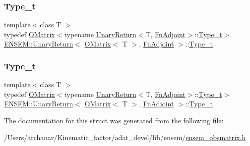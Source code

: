 \subsubsection{\texorpdfstring{Type\_t}{Type\_t}\hspace{0.1cm}{\footnotesize\ttfamily [1/2]}}
{\footnotesize\ttfamily template$<$class T $>$ \\
typedef \mbox{\hyperlink{classENSEM_1_1OMatrix}{O\+Matrix}}$<$typename \mbox{\hyperlink{structENSEM_1_1UnaryReturn}{Unary\+Return}}$<$T, \mbox{\hyperlink{structENSEM_1_1FnAdjoint}{Fn\+Adjoint}}$>$\+::\mbox{\hyperlink{structENSEM_1_1UnaryReturn_3_01OMatrix_3_01T_01_4_00_01FnAdjoint_01_4_aa00f2dd53b3936a34ade7e353b17b138}{Type\+\_\+t}}$>$ \mbox{\hyperlink{structENSEM_1_1UnaryReturn}{E\+N\+S\+E\+M\+::\+Unary\+Return}}$<$ \mbox{\hyperlink{classENSEM_1_1OMatrix}{O\+Matrix}}$<$ T $>$, \mbox{\hyperlink{structENSEM_1_1FnAdjoint}{Fn\+Adjoint}} $>$\+::\mbox{\hyperlink{structENSEM_1_1UnaryReturn_3_01OMatrix_3_01T_01_4_00_01FnAdjoint_01_4_aa00f2dd53b3936a34ade7e353b17b138}{Type\+\_\+t}}}

\mbox{\label{structENSEM_1_1UnaryReturn_3_01OMatrix_3_01T_01_4_00_01FnAdjoint_01_4_aa00f2dd53b3936a34ade7e353b17b138}} 
\subsubsection{\texorpdfstring{Type\_t}{Type\_t}\hspace{0.1cm}{\footnotesize\ttfamily [2/2]}}
{\footnotesize\ttfamily template$<$class T $>$ \\
typedef \mbox{\hyperlink{classENSEM_1_1OMatrix}{O\+Matrix}}$<$typename \mbox{\hyperlink{structENSEM_1_1UnaryReturn}{Unary\+Return}}$<$T, \mbox{\hyperlink{structENSEM_1_1FnAdjoint}{Fn\+Adjoint}}$>$\+::\mbox{\hyperlink{structENSEM_1_1UnaryReturn_3_01OMatrix_3_01T_01_4_00_01FnAdjoint_01_4_aa00f2dd53b3936a34ade7e353b17b138}{Type\+\_\+t}}$>$ \mbox{\hyperlink{structENSEM_1_1UnaryReturn}{E\+N\+S\+E\+M\+::\+Unary\+Return}}$<$ \mbox{\hyperlink{classENSEM_1_1OMatrix}{O\+Matrix}}$<$ T $>$, \mbox{\hyperlink{structENSEM_1_1FnAdjoint}{Fn\+Adjoint}} $>$\+::\mbox{\hyperlink{structENSEM_1_1UnaryReturn_3_01OMatrix_3_01T_01_4_00_01FnAdjoint_01_4_aa00f2dd53b3936a34ade7e353b17b138}{Type\+\_\+t}}}



The documentation for this struct was generated from the following file\+:\begin{DoxyCompactItemize}
\item 
/\+Users/archanar/\+Kinematic\+\_\+factor/adat\+\_\+devel/lib/ensem/\mbox{\hyperlink{lib_2ensem_2ensem__obsmatrix_8h}{ensem\+\_\+obsmatrix.\+h}}\end{DoxyCompactItemize}
